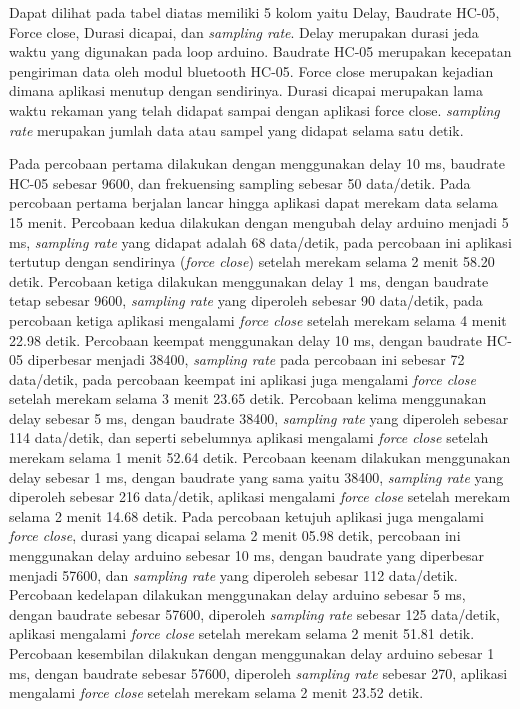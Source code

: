 Dapat dilihat pada tabel diatas memiliki 5 kolom yaitu Delay, Baudrate HC-05, Force close, Durasi dicapai, dan \textit{sampling rate}. Delay merupakan durasi jeda waktu yang digunakan pada loop arduino. Baudrate HC-05 merupakan kecepatan pengiriman data oleh modul bluetooth HC-05. Force close merupakan kejadian dimana aplikasi menutup dengan sendirinya. Durasi dicapai merupakan lama waktu rekaman yang telah didapat sampai dengan aplikasi force close. \textit{sampling rate} merupakan jumlah data atau sampel yang didapat selama satu detik.

Pada percobaan pertama dilakukan dengan menggunakan delay 10 ms, baudrate HC-05 sebesar 9600, dan frekuensing sampling sebesar 50 data/detik. Pada percobaan pertama berjalan lancar hingga aplikasi dapat merekam data selama 15 menit. Percobaan kedua dilakukan dengan mengubah delay arduino menjadi 5 ms, \textit{sampling rate} yang didapat adalah 68 data/detik, pada percobaan ini aplikasi tertutup dengan sendirinya (\textit{force close}) setelah merekam selama 2 menit 58.20 detik. Percobaan ketiga dilakukan menggunakan delay 1 ms, dengan baudrate tetap sebesar 9600, \textit{sampling rate} yang diperoleh sebesar 90 data/detik, pada percobaan ketiga aplikasi mengalami \textit{force close} setelah merekam selama 4 menit 22.98 detik. Percobaan keempat menggunakan delay 10 ms, dengan baudrate HC-05 diperbesar menjadi 38400, \textit{sampling rate} pada percobaan ini sebesar 72 data/detik, pada percobaan keempat ini aplikasi juga mengalami \textit{force close} setelah merekam selama 3 menit 23.65 detik. Percobaan kelima menggunakan delay sebesar 5 ms, dengan baudrate 38400, \textit{sampling rate} yang diperoleh
sebesar 114 data/detik, dan seperti sebelumnya aplikasi mengalami \textit{force close} setelah merekam selama 1 menit 52.64 detik. Percobaan keenam dilakukan menggunakan delay sebesar 1 ms, dengan baudrate yang sama yaitu 38400, \textit{sampling rate} yang diperoleh sebesar 216 data/detik, aplikasi mengalami \textit{force close} setelah merekam selama 2 menit 14.68 detik. Pada percobaan ketujuh aplikasi juga mengalami \textit{force close}, durasi yang dicapai selama 2 menit 05.98 detik, percobaan ini menggunakan delay arduino sebesar 10 ms, dengan baudrate yang diperbesar menjadi 57600, dan \textit{sampling rate} yang diperoleh sebesar 112 data/detik. Percobaan kedelapan dilakukan menggunakan delay arduino sebesar 5 ms, dengan baudrate sebesar 57600, diperoleh \textit{sampling rate} sebesar 125 data/detik, aplikasi mengalami \textit{force close} setelah merekam selama 2 menit 51.81 detik. Percobaan kesembilan dilakukan dengan menggunakan delay arduino sebesar 1 ms, dengan baudrate sebesar 57600, diperoleh \textit{sampling rate} sebesar 270, aplikasi mengalami \textit{force close} setelah merekam selama 2 menit 23.52 detik. 

